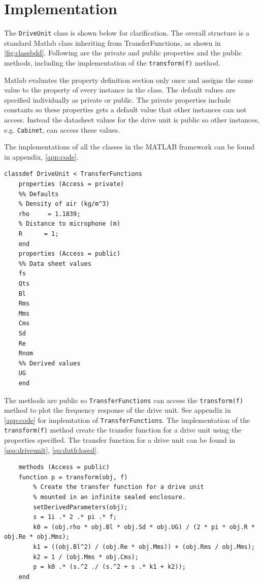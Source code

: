 \section{Implementation}
The \texttt{DriveUnit} class is shown below for clarification. 
The overall structure is a standard Matlab class inheriting from TransferFunctions, as shown in \cref{fig:classbdd}. 
Following are the private and public properties and the public methods, including the implementation of the \texttt{transform(f)} method.

Matlab evaluates the property definition section only once and assigns the same value to the property of every instance in the class.
The default values are specified individually as private or public.
The private properties include constants so these properties gets a default value that other instances can not access. 
Instead the datasheet values for the drive unit is public so other instances, e.g. \texttt{Cabinet}, can access these values.

The implementations of all the classes in the MATLAB framework can be found in appendix, \cref{app:code}. 


\begin{verbatim}
classdef DriveUnit < TransferFunctions
    properties (Access = private)
	%% Defaults
	% Density of air (kg/m^3)
	rho     = 1.1839;
	% Distance to microphone (m)
	R      = 1;
	end
    properties (Access = public)
	%% Data sheet values
	fs
	Qts
	Bl
	Rms
	Mms
	Cms
	Sd
	Re
	Rnom
	%% Derived values
	UG
    end
\end{verbatim}

The methods are public so \texttt{TransferFunctions} can access the \texttt{transform(f)} method to plot the frequency response of the drive unit. See appendix in \cref{app:code} for implemtation of \texttt{TransferFunctions}.
The implementation of the \texttt{transform(f)} method create the transfer function for a drive unit using the properties specified.
The transfer function for a drive unit can be found in \cref{seq:driveunit}, \cref{eq:dutfclosed}.

\begin{verbatim}
    methods (Access = public)
	function p = transform(obj, f)
	    % Create the transfer function for a drive unit
	    % mounted in an infinite sealed enclosure.
	    setDerivedParameters(obj);
	    s = 1i .* 2 .* pi .* f;
	    k0 = (obj.rho * obj.Bl * obj.Sd * obj.UG) / (2 * pi * obj.R * obj.Re * obj.Mms);
	    k1 = ((obj.Bl^2) / (obj.Re * obj.Mms)) + (obj.Rms / obj.Mms);
	    k2 = 1 / (obj.Mms * obj.Cms);
	    p = k0 .* (s.^2 ./ (s.^2 + s .* k1 + k2));
	end
\end{verbatim}

